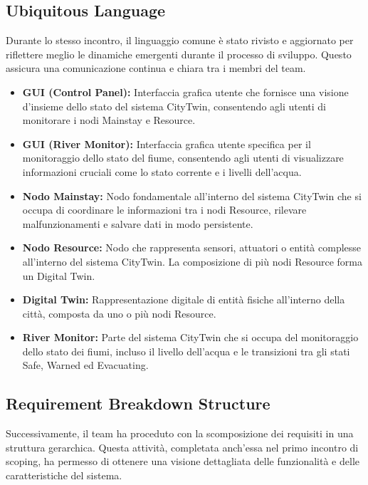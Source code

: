 \subsection{Ubiquitous Language}

Durante lo stesso incontro, il linguaggio comune è stato rivisto e aggiornato per riflettere meglio le dinamiche emergenti durante il processo di sviluppo. Questo assicura una comunicazione continua e chiara tra i membri del team.

\begin{itemize}
    \item \textbf{GUI (Control Panel):} Interfaccia grafica utente che fornisce una visione d'insieme dello stato del sistema CityTwin, consentendo agli utenti di monitorare i nodi Mainstay e Resource.
  
    \item \textbf{GUI (River Monitor):} Interfaccia grafica utente specifica per il monitoraggio dello stato del fiume, consentendo agli utenti di visualizzare informazioni cruciali come lo stato corrente e i livelli dell'acqua.
  
    \item \textbf{Nodo Mainstay:} Nodo fondamentale all'interno del sistema CityTwin che si occupa di coordinare le informazioni tra i nodi Resource, rilevare malfunzionamenti e salvare dati in modo persistente.
  
    \item \textbf{Nodo Resource:} Nodo che rappresenta sensori, attuatori o entità complesse all'interno del sistema CityTwin. La composizione di più nodi Resource forma un Digital Twin.
  
    \item \textbf{Digital Twin:} Rappresentazione digitale di entità fisiche all'interno della città, composta da uno o più nodi Resource.
  
    \item \textbf{River Monitor:} Parte del sistema CityTwin che si occupa del monitoraggio dello stato dei fiumi, incluso il livello dell'acqua e le transizioni tra gli stati Safe, Warned ed Evacuating.
  
  \end{itemize}

\subsection{Requirement Breakdown Structure}

Successivamente, il team ha proceduto con la scomposizione dei requisiti in una struttura gerarchica. Questa attività, completata anch'essa nel primo incontro di scoping, ha permesso di ottenere una visione dettagliata delle funzionalità e delle caratteristiche del sistema.

